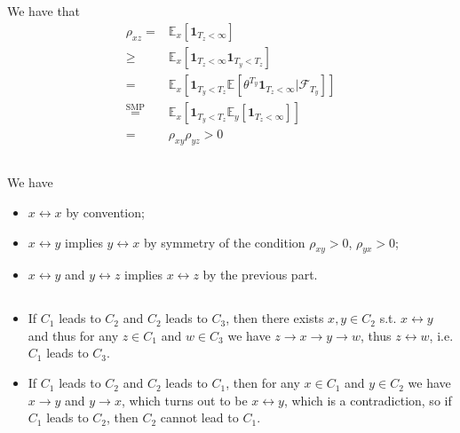 \documentclass[11pt,a4paper]{ctexart}
\numberwithin{equation}{section}%
\newcommand{\F}{\mathcal{F}}
\begin{document}
\subsection{}
We have that
\begin{align*}
    \rho _{xz}=& \mathbb{E}_{ x }\left[ \mathbf{1}_{T_z<\infty} \right]\\
    \geq& \mathbb{E}_{ x }\left[ \mathbf{1}_{T_z <\infty}\mathbf{1}_{T_y<T_z} \right]   \\
    =& \mathbb{E}_{ x }\left[ \mathbf{1}_{T_y < T_z}\mathbb{E}_{  }\left[ \theta ^{T_y}\mathbf{1}_{T_z<\infty } | \F_{T_y} \right]  \right]   \\
    \mathop{ = }\limits^{\text{SMP}}& \mathbb{E}_{ x }\left[ \mathbf{1}_{T_y < T_z}\mathbb{E}_{ y }\left[ \mathbf{1}_{T_z<\infty } \right]  \right]   \\ 
    =&\rho _{xy}\rho _{yz} > 0
\end{align*}

\subsection{}

We have
\begin{itemize}[topsep=2pt,itemsep=0pt]
    \item $ x\leftrightarrow x $ by convention;
    \item $ x\leftrightarrow y $ implies $ y\leftrightarrow x $ by symmetry of the condition $ \rho _{xy}>0 $, $ \rho _{yx}>0 $;
    \item $ x\leftrightarrow y $ and $ y\leftrightarrow z $ implies $ x\leftrightarrow z $ by the previous part.
\end{itemize}

\subsection{}

\begin{itemize}[topsep=2pt,itemsep=0pt]
    \item If $ C_1 $ leads to $ C_2 $ and $ C_2 $ leads to $ C_3 $, then there exists $ x,y\in C_2 $ s.t. $ x\leftrightarrow y $ and thus for any $ z\in C_1 $ and $ w\in C_3 $ we have $ z\to  x \to y \to w $, thus $ z\leftrightarrow w $, i.e. $ C_1 $ leads to $ C_3 $.
    \item If $ C_1 $ leads to $ C_2 $ and $ C_2 $ leads to $ C_1 $, then for any $ x\in C_1 $ and $ y\in C_2 $ we have $ x\to y$ and $ y\to x $, which turns out to be $ x\leftrightarrow y $, which is a contradiction, so if $ C_1 $ leads to $ C_2 $, then $ C_2 $ cannot lead to $ C_1 $.
\end{itemize}
\end{document}
